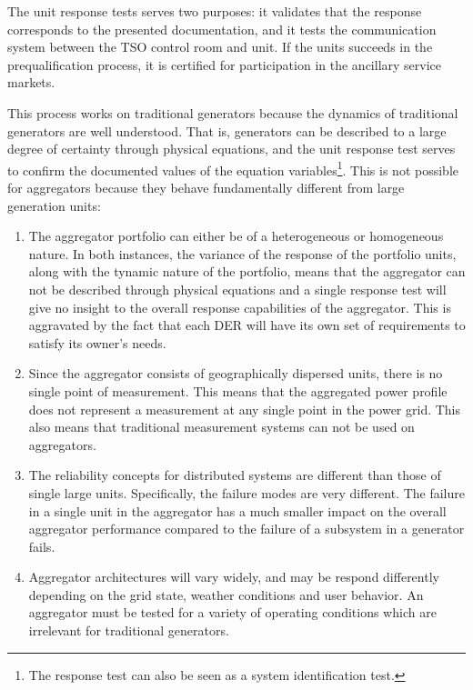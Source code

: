 The unit response tests serves two purposes: it validates that the response corresponds to the presented documentation, and it tests the communication system between the TSO control room and unit. If the units succeeds in the prequalification process, it is certified for participation in the ancillary service markets.

This process works on traditional generators because the dynamics of traditional generators are well understood. That is, generators can be described to a large degree of certainty through physical equations, and the unit response test serves to confirm the documented values of the equation variables\footnote{The response test can also be seen as a system identification test.}. This is not possible for aggregators because they behave fundamentally different from large generation units:
\begin{enumerate}
	\item The aggregator portfolio can either be of a heterogeneous or homogeneous nature. In both instances, the variance of the response of the portfolio units, along with the tynamic nature of the portfolio, means that the aggregator can not be described through physical equations and a single response test will give no insight to the overall response capabilities of the aggregator. This is aggravated by the fact that each DER will have its own set of requirements to satisfy its owner's needs.
	\item Since the aggregator consists of geographically dispersed units, there is no single point of measurement. This means that the aggregated power profile does not represent a measurement at any single point in the power grid. This also means that traditional measurement systems can not be used on aggregators.
	\item The reliability concepts for distributed systems are different than those of single large units. Specifically, the failure modes are very different. The failure in a single unit in the aggregator has a much smaller impact on the overall aggregator performance compared to the failure of a subsystem in a generator fails.
	\item Aggregator architectures will vary widely, and may be respond differently depending on the grid state, weather conditions and user behavior. An aggregator must be tested for a variety of operating conditions which are irrelevant for traditional generators.
\end{enumerate}

